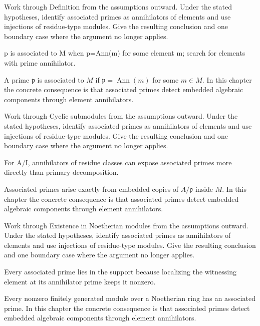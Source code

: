 \begin{exercise}\label{exr:v17-01}
Work through Definition from the assumptions outward. Under the stated hypotheses, identify associated primes as annihilators of elements and use injections of residue-type modules. Give the resulting conclusion and one boundary case where the argument no longer applies.
\end{exercise}
\begin{hint}
p is associated to M when p=Ann(m) for some element m; search for elements with prime annihilator.
\end{hint}
\begin{solution}
A prime $\mathfrak p$ is associated to $M$ if $\mathfrak p=\operatorname{Ann}(m)$ for some $m\in M$. In this chapter the concrete consequence is that associated primes detect embedded algebraic components through element annihilators.
\end{solution}

\begin{exercise}\label{exr:v17-02}
Work through Cyclic submodules from the assumptions outward. Under the stated hypotheses, identify associated primes as annihilators of elements and use injections of residue-type modules. Give the resulting conclusion and one boundary case where the argument no longer applies.
\end{exercise}
\begin{hint}
For A/I, annihilators of residue classes can expose associated primes more directly than primary decomposition.
\end{hint}
\begin{solution}
Associated primes arise exactly from embedded copies of $A/\mathfrak p$ inside $M$. In this chapter the concrete consequence is that associated primes detect embedded algebraic components through element annihilators.
\end{solution}

\begin{exercise}\label{exr:v17-03}
Work through Existence in Noetherian modules from the assumptions outward. Under the stated hypotheses, identify associated primes as annihilators of elements and use injections of residue-type modules. Give the resulting conclusion and one boundary case where the argument no longer applies.
\end{exercise}
\begin{hint}
Every associated prime lies in the support because localizing the witnessing element at its annihilator prime keeps it nonzero.
\end{hint}
\begin{solution}
Every nonzero finitely generated module over a Noetherian ring has an associated prime. In this chapter the concrete consequence is that associated primes detect embedded algebraic components through element annihilators.
\end{solution}


